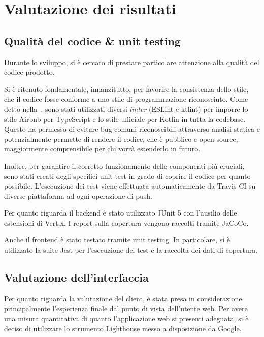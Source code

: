 \chapter{Valutazione dei risultati}\label{ch:evaluation}

  \section{Qualità del codice \& unit testing}
    Durante lo sviluppo, si è cercato di prestare particolare attenzione alla qualità del codice prodotto.

    Si è ritenuto fondamentale, innanzitutto, per favorire la consistenza dello stile, che il codice fosse conforme a uno stile di programmazione riconosciuto.
    Come detto nella~, sono stati utilizzati diversi \emph{linter} (ESLint e ktlint)
    per imporre lo stile Airbnb per TypeScript e lo stile ufficiale per Kotlin in tutta la codebase.
    Questo ha permesso di evitare bug comuni riconoscibili attraverso analisi statica
    e potenzialmente permette di rendere il codice, che è pubblico e open-source, maggiormente comprensibile per chi vorrà estenderlo in futuro.

    Inoltre, per garantire il corretto funzionamento delle componenti più cruciali, sono stati creati degli specifici unit test in grado di coprire il codice per quanto possibile.
    L'esecuzione dei test viene effettuata automaticamente da Travis CI su diverse piattaforma ad ogni operazione di push.

    Per quanto riguarda il backend è stato utilizzato JUnit 5 con l'ausilio delle estensioni di Vert.x.
    I report sulla copertura vengono raccolti tramite JaCoCo.


    Anche il frontend è stato testato tramite unit testing.
    In particolare, si è utilizzato la suite Jest per l'esecuzione dei test e la raccolta dei dati di copertura.


  \section{Valutazione dell'interfaccia}
    Per quanto riguarda la valutazione del client, è stata presa in considerazione principalmente l'esperienza finale dal punto di vista dell'utente web.
    Per avere una misura quantitativa di quanto l'applicazione web si presenti adeguata, si è deciso di utilizzare lo strumento Lighthouse messo a disposizione da Google.

